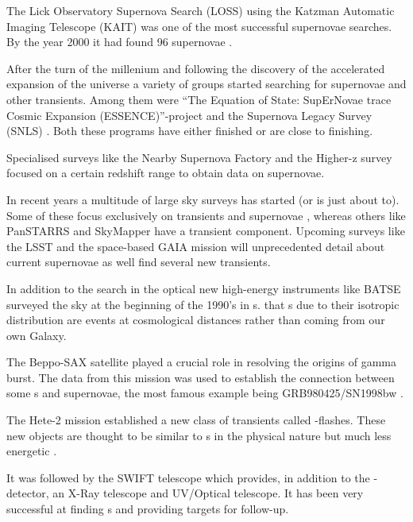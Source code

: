 The Lick Observatory Supernova Search (LOSS) using the Katzman Automatic Imaging Telescope (KAIT) was one of the most successful supernovae searches. By the year 2000 it had found 96 supernovae \citep{2001ASPC..246..121F}. 

After the turn of the millenium and following the discovery of the accelerated expansion of the universe a variety of groups started searching for supernovae and other transients. Among them were ``The Equation of State: SupErNovae trace Cosmic Expansion (ESSENCE)''-project \citep{2002AAS...201.7809G} and the Supernova Legacy Survey (SNLS) \citep{2003AAS...203.8209P}. Both these programs have either finished or are close to finishing. 

Specialised surveys like the Nearby Supernova Factory \citep{2002SPIE.4836...61A} and the Higher-z survey \cite{2004ApJ...613..200S} focused on a certain redshift range to obtain data on supernovae.

In recent years a multitude of large sky surveys has started (or is just about to). Some of these focus exclusively on transients and supernovae \citep[e.g. PTF][]{2009PASP..121.1334R}, whereas others like PanSTARRS \citep{2004SPIE.5489...11K} and SkyMapper \citep{2007PASA...24....1K} have a transient component. 
Upcoming surveys like the LSST \cite{2006AAS...209.8604P} and the space-based GAIA mission \cite{2001A&A...369..339P} will unprecedented detail about current supernovae as well find several new transients.

In addition to the search in the optical new high-energy instruments like BATSE surveyed the sky at the beginning of the 1990's in \gammaray s. \citet{1992Natur.355..143M} that \grb s due to their isotropic distribution are events at cosmological distances rather than coming from our own Galaxy. 

The Beppo-SAX satellite played a crucial role in resolving the origins of gamma burst. The data from this mission was used to establish the connection between some \grb s and supernovae, the most famous example being GRB980425/SN1998bw \citep{1998Natur.395..670G}.

The Hete-2 mission established a new class of transients called \xray-flashes. These new objects are thought to be similar to  \grb s in the physical nature but much less energetic \citep{2004ApJ...601L.119Z}.  

It was followed by the SWIFT telescope which provides, in addition to the \gammaray-detector, an X-Ray telescope and UV/Optical telescope. It has been very successful at finding \grb s and providing targets for follow-up.

